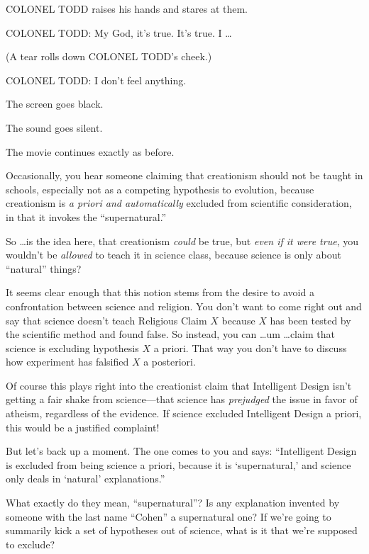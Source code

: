 {
 COLONEL TODD raises his hands and stares at them.}

{
 COLONEL TODD: My God, it's true.
It's true. I \ldots}

{
 (A tear rolls down COLONEL TODD's cheek.)}

{
 COLONEL TODD: I don't feel anything.}

{
 The screen goes black.}

{
 The sound goes silent.}

{
 The movie continues exactly as before.}

\myendsectiontext


{
 Occasionally, you hear someone claiming that creationism should
not be taught in schools, especially not as a competing hypothesis to
evolution, because creationism is \textit{a priori and automatically}
excluded from scientific consideration, in that it invokes the
``supernatural.'' }

{
 So \ldots is the idea here, that creationism \textit{could} be
true, but \textit{even if it were true}, you wouldn't
be \textit{allowed} to teach it in science class, because science is
only about ``natural'' things?}

{
 It seems clear enough that this notion stems from the desire to
avoid a confrontation between science and religion. You
don't want to come right out and say that science
doesn't teach Religious Claim $X$ because $X$ has been
tested by the scientific method and found false. So instead, you can
\ldots um \ldots claim that science is excluding hypothesis $X$ a priori.
That way you don't have to discuss how experiment has
falsified $X$ a posteriori.}

{
 Of course this plays right into the creationist claim that
Intelligent Design isn't getting a fair shake from
science---that science has \textit{prejudged} the issue in favor of
atheism, regardless of the evidence. If science excluded Intelligent
Design a priori, this would be a justified complaint!}

{
 But let's back up a moment. The one comes to you
and says: ``Intelligent Design is excluded from being
science a priori, because it is
`supernatural,' and science only deals
in `natural'
explanations.''}

{
 What exactly do they mean,
``supernatural''? Is any explanation
invented by someone with the last name
``Cohen'' a supernatural one? If
we're going to summarily kick a set of hypotheses out
of science, what is it that we're supposed to exclude?}

